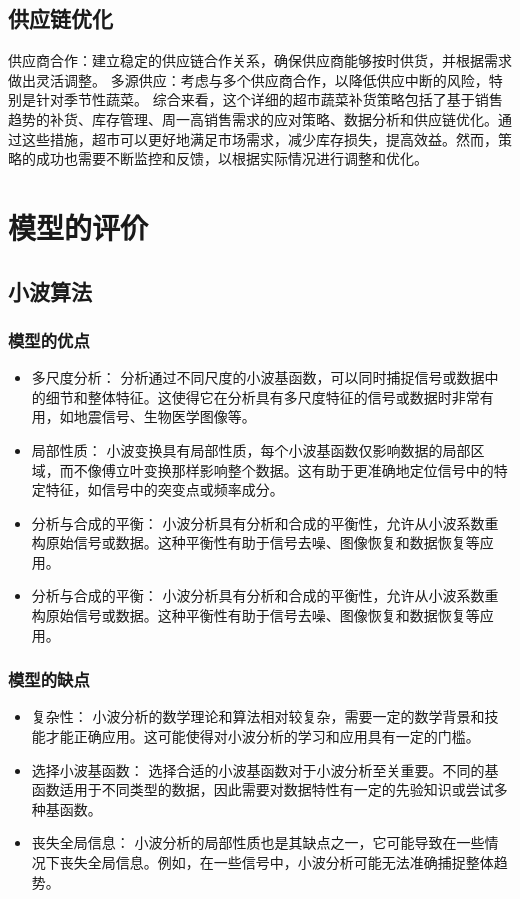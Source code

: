\documentclass[withoutpreface,bwprint]{cumcmthesis} %
\begin{document}
\subsection{供应链优化}	
	供应商合作：建立稳定的供应链合作关系，确保供应商能够按时供货，并根据需求做出灵活调整。
	多源供应：考虑与多个供应商合作，以降低供应中断的风险，特别是针对季节性蔬菜。
	综合来看，这个详细的超市蔬菜补货策略包括了基于销售趋势的补货、库存管理、周一高销售需求的应对策略、数据分析和供应链优化。通过这些措施，超市可以更好地满足市场需求，减少库存损失，提高效益。然而，策略的成功也需要不断监控和反馈，以根据实际情况进行调整和优化。
	
	\section{模型的评价}
		\subsection{小波算法}
		
\subsubsection{模型的优点}
\begin{itemize}
	\item 多尺度分析： 分析通过不同尺度的小波基函数，可以同时捕捉信号或数据中的细节和整体特征。这使得它在分析具有多尺度特征的信号或数据时非常有用，如地震信号、生物医学图像等。
	\item 局部性质： 小波变换具有局部性质，每个小波基函数仅影响数据的局部区域，而不像傅立叶变换那样影响整个数据。这有助于更准确地定位信号中的特定特征，如信号中的突变点或频率成分。
	\item 分析与合成的平衡： 小波分析具有分析和合成的平衡性，允许从小波系数重构原始信号或数据。这种平衡性有助于信号去噪、图像恢复和数据恢复等应用。
	\item 分析与合成的平衡： 小波分析具有分析和合成的平衡性，允许从小波系数重构原始信号或数据。这种平衡性有助于信号去噪、图像恢复和数据恢复等应用。
\end{itemize}
\subsubsection{模型的缺点}
\begin{itemize}
	\item 复杂性： 小波分析的数学理论和算法相对较复杂，需要一定的数学背景和技能才能正确应用。这可能使得对小波分析的学习和应用具有一定的门槛。
	\item 选择小波基函数： 选择合适的小波基函数对于小波分析至关重要。不同的基函数适用于不同类型的数据，因此需要对数据特性有一定的先验知识或尝试多种基函数。
	\item 丧失全局信息： 小波分析的局部性质也是其缺点之一，它可能导致在一些情况下丧失全局信息。例如，在一些信号中，小波分析可能无法准确捕捉整体趋势。
\end{itemize}
\end{document}
